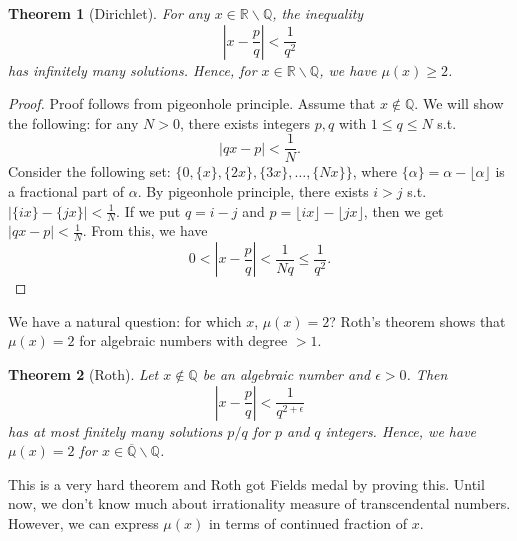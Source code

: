 \documentclass{article}
\newtheorem{theorem}{Theorem}
\begin{document}
\begin{theorem}[Dirichlet]
For any $x\in \mathbb{R}\backslash \mathbb{Q}$, the inequality 
$$
\left| x-\frac{p}{q}\right| <\frac{1}{q^{2}}
$$
has infinitely many solutions. Hence, for $x\in \mathbb{R}\backslash \mathbb{Q}$, we have $\mu(x)\geq 2$. 
\end{theorem}
\begin{proof}
Proof follows from pigeonhole principle. Assume that $x\not\in \mathbb{Q}$. We will show the following: for any $N>0$, there exists integers  $p, q$ with $1\leq q\leq N$ s.t. 
$$
|qx-p|<\frac{1}{N}.
$$
Consider the following set: $\{0, \{x\}, \{2x\}, \{3x\}, \dots, \{Nx\}\}$, where $\{\alpha\} = \alpha - \lfloor\alpha\rfloor$ is a fractional part of $\alpha$. By pigeonhole principle, there exists $i>j$ s.t. $|\{ix\} - \{jx\}|< \frac{1}{N}$. If we put $q = i-j$ and $p = \lfloor ix\rfloor - \lfloor jx \rfloor$, then we get $|qx-p|<\frac{1}{N}$. 
From this, we have
$$
0<\left|x - \frac{p}{q}\right| < \frac{1}{Nq} \leq \frac{1}{q^{2}}. 
$$
\end{proof}

We have a natural question: for which $x$, $\mu(x) = 2$? Roth's theorem shows that $\mu(x) = 2$ for algebraic numbers with degree $>1$. 

\begin{theorem}[Roth]
Let $x\not\in\mathbb{Q}$ be an algebraic number and $\epsilon>0$. Then 
$$
\left| x-\frac{p}{q}\right| <\frac{1}{q^{2+\epsilon}}
$$
has at most finitely many solutions $p/q$ for $p$ and $q$ integers. Hence, we have $\mu(x) = 2$ for $x\in \overline{\mathbb{Q}}\backslash\mathbb{Q}$.
\end{theorem}
This is a very hard theorem and Roth got Fields medal by proving this. Until now, we don't know much about irrationality measure of transcendental numbers. However,  we can express $\mu(x)$ in terms of continued fraction of $x$. 
\end{document}
